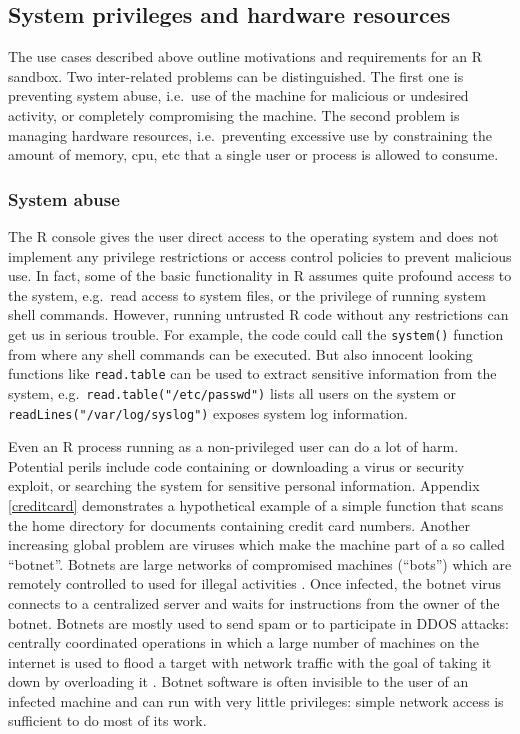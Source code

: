 \documentclass{jss}
\newcommand{\R}{\textsf{R}\xspace}
\begin{document}
\subsection{System privileges and hardware resources}

The use cases described above outline motivations and requirements for an \R
sandbox. Two inter-related problems can be distinguished. The first one is
preventing system abuse, i.e.\ use of the machine for malicious or undesired
activity, or completely compromising the machine. The second problem is managing
hardware resources, i.e.\ preventing excessive use by constraining the amount of
memory, cpu, etc that a single user or process is allowed to consume.

\subsubsection{System abuse}

The \R console gives the user direct access to the operating system and does not
implement any privilege restrictions or access control policies to prevent
malicious use. In fact, some of the basic functionality in \R assumes quite
profound access to the system, e.g.\ read access to system files, or the
privilege of running system shell commands. However, running untrusted \R code
without any restrictions can get us in serious trouble. For example, the code
could call the \texttt{system()} function from where any shell commands can be
executed. But also innocent looking functions like \texttt{read.table} can be
used to extract sensitive information from the system, e.g.\
\texttt{read.table("/etc/passwd")} lists all users on the system or
\texttt{readLines("/var/log/syslog")} exposes system log information.

Even an \R process running as a non-privileged user can do a lot of harm.
Potential perils include code containing or downloading a virus or security
exploit, or searching the system for sensitive personal information. Appendix
\ref{creditcard} demonstrates a hypothetical example of a simple function that
scans the home directory for documents containing credit card numbers. Another
increasing global problem are viruses which make the machine part of a so called
``botnet''. Botnets are large networks of compromised machines (``bots'') which
are remotely controlled to used for illegal activities
\citep{abu2006multifaceted}. Once infected, the botnet virus connects to a
centralized server and waits for instructions from the owner of the botnet.
Botnets are mostly used to send spam or to participate in DDOS attacks:
centrally coordinated operations in which a large number of machines on the
internet is used to flood a target with network traffic with the goal of taking
it down by overloading it \citep{mirkovic2004taxonomy}. Botnet software is often
invisible to the user of an infected machine and can run with very little
privileges: simple network access is sufficient to do most of its work.
\end{document}
